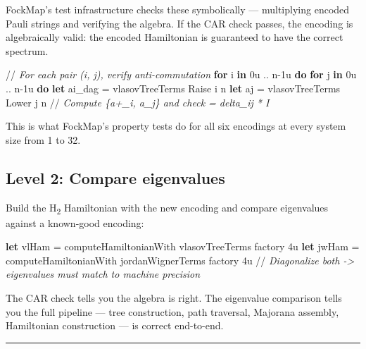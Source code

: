 \documentclass[
  11pt,
  oneside]{book}
\newenvironment{Shaded}{\begin{snugshade}}{\end{snugshade}}
\newcommand{\CommentTok}[1]{\textcolor[rgb]{0.56,0.35,0.01}{\textit{#1}}}
\newcommand{\DecValTok}[1]{\textcolor[rgb]{0.00,0.00,0.81}{#1}}
\newcommand{\KeywordTok}[1]{\textcolor[rgb]{0.13,0.29,0.53}{\textbf{#1}}}
\newcommand{\NormalTok}[1]{#1}
\begin{document}
FockMap's test infrastructure checks these symbolically --- multiplying
encoded Pauli strings and verifying the algebra. If the CAR check
passes, the encoding is algebraically valid: the encoded Hamiltonian is
guaranteed to have the correct spectrum.

\begin{Shaded}
\begin{Highlighting}[]
\NormalTok{//}\CommentTok{ For each pair (i, j), verify anti{-}commutation}
\KeywordTok{for}\NormalTok{ i }\KeywordTok{in} \DecValTok{0}\NormalTok{u .. n}\DecValTok{{-}1}\NormalTok{u }\KeywordTok{do}
    \KeywordTok{for}\NormalTok{ j }\KeywordTok{in} \DecValTok{0}\NormalTok{u .. n}\DecValTok{{-}1}\NormalTok{u }\KeywordTok{do}
        \KeywordTok{let}\NormalTok{ ai\_dag = vlasovTreeTerms Raise i n}
        \KeywordTok{let}\NormalTok{ aj     = vlasovTreeTerms Lower j n}
\NormalTok{        //}\CommentTok{ Compute \{a+\_i, a\_j\} and check = delta\_ij * I}
\end{Highlighting}
\end{Shaded}

This is what FockMap's property tests do for all six encodings at every
system size from 1 to 32.

\subsection{Level 2: Compare
eigenvalues}\label{level-2-compare-eigenvalues}

Build the H\textsubscript{2} Hamiltonian with the new encoding and compare eigenvalues
against a known-good encoding:

\begin{Shaded}
\begin{Highlighting}[]
\KeywordTok{let}\NormalTok{ vlHam = computeHamiltonianWith vlasovTreeTerms factory }\DecValTok{4}\NormalTok{u}
\KeywordTok{let}\NormalTok{ jwHam = computeHamiltonianWith jordanWignerTerms factory }\DecValTok{4}\NormalTok{u}
\NormalTok{//}\CommentTok{ Diagonalize both -> eigenvalues must match to machine precision}
\end{Highlighting}
\end{Shaded}

The CAR check tells you the algebra is right. The eigenvalue comparison
tells you the full pipeline --- tree construction, path traversal,
Majorana assembly, Hamiltonian construction --- is correct end-to-end.

\begin{center}\rule{0.5\linewidth}{0.5pt}\end{center}
\end{document}
